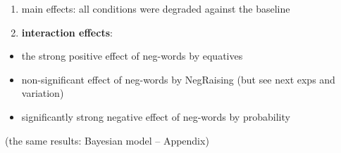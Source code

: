 \documentclass[
  letterpaper,
  DIV=11,
  numbers=noendperiod]{scrartcl}
\providecommand{\tightlist}{%
  \setlength{\itemsep}{0pt}\setlength{\parskip}{0pt}}\usepackage{longtable,booktabs,array}
\begin{document}
\begin{enumerate}
\def\labelenumi{\arabic{enumi}.}
\item
  main effects: all conditions were degraded against the baseline
\item
  \textbf{interaction effects}:
\end{enumerate}

\begin{itemize}
\tightlist
\item
  the strong positive effect of neg-words by equatives
\item
  non-significant effect of neg-words by NegRaising (but see next exps
  and variation)
\item
  significantly strong negative effect of neg-words by probability
\end{itemize}

(the same results: Bayesian model -- Appendix)

\footnotesize
\end{document}
